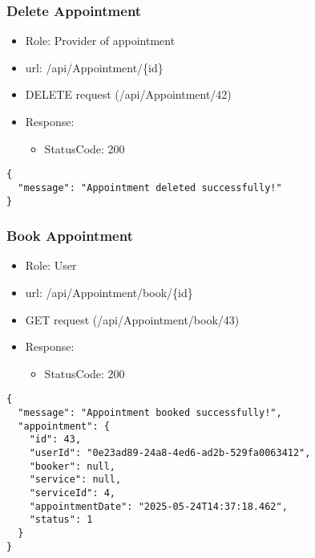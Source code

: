 \documentclass[11pt]{article}
\begin{document}
\subsubsection{Delete Appointment}
\label{sec:orgeea07b3}
\begin{itemize}
\item Role: Provider of appointment
\item url: /api/Appointment/\{id\}
\item DELETE request (/api/Appointment/42)
\item Response:
\begin{itemize}
\item StatusCode: 200
\end{itemize}
\end{itemize}
\begin{verbatim}
{
  "message": "Appointment deleted successfully!"
}
\end{verbatim}
\subsubsection{Book Appointment}
\label{sec:orgca05cd4}
\begin{itemize}
\item Role: User
\item url: /api/Appointment/book/\{id\}
\item GET request (/api/Appointment/book/43)
\item Response:
\begin{itemize}
\item StatusCode: 200
\end{itemize}
\end{itemize}
\begin{verbatim}
{
  "message": "Appointment booked successfully!",
  "appointment": {
    "id": 43,
    "userId": "0e23ad89-24a8-4ed6-ad2b-529fa0063412",
    "booker": null,
    "service": null,
    "serviceId": 4,
    "appointmentDate": "2025-05-24T14:37:18.462",
    "status": 1
  }
}
\end{verbatim}
\end{document}

